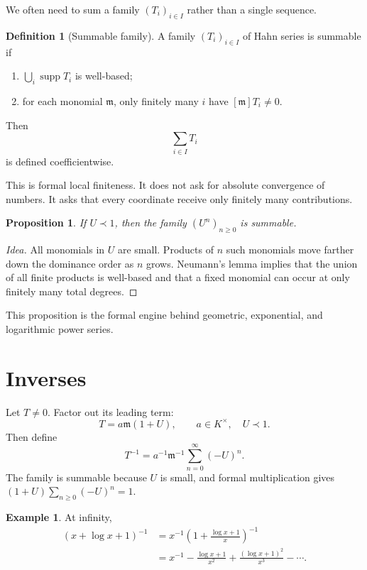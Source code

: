 \documentclass[11pt,oneside]{book}
\newtheorem{proposition}[theorem]{Proposition}
\theoremstyle{definition}
\newtheorem{definition}[theorem]{Definition}
\newtheorem{example}[theorem]{Example}
\theoremstyle{remark}
\newcommand{\m}{\mathfrak{m}}
\newcommand{\supp}{\operatorname{supp}}
\newcommand{\precdom}{\prec}
\begin{document}
We often need to sum a family $(T_i)_{i\in I}$ rather than a single sequence.

\begin{definition}[Summable family]
A family $(T_i)_{i\in I}$ of Hahn series is summable if
\begin{enumerate}
\item $\bigcup_i\supp T_i$ is well-based;
\item for each monomial $\m$, only finitely many $i$ have
      $[\m]T_i\ne0$.
\end{enumerate}
Then
\[
  \sum_{i\in I}T_i
\]
is defined coefficientwise.
\end{definition}

This is formal local finiteness. It does not ask for absolute convergence of
numbers. It asks that every coordinate receive only finitely many contributions.

\begin{proposition}
If $U\precdom1$, then the family $(U^n)_{n\ge0}$ is summable.
\end{proposition}

\begin{proof}[Idea]
All monomials in $U$ are small. Products of $n$ such monomials move farther down
the dominance order as $n$ grows. Neumann's lemma implies that the union of all
finite products is well-based and that a fixed monomial can occur at only
finitely many total degrees.
\end{proof}

This proposition is the formal engine behind geometric, exponential, and
logarithmic power series.

\section{Inverses}

Let $T\ne0$. Factor out its leading term:
\[
  T=a\m(1+U),
  \qquad a\in K^\times,\quad U\precdom1.
\]
Then define
\begin{equation}
  T^{-1}=a^{-1}\m^{-1}\sum_{n=0}^{\infty}(-U)^n.
  \label{eq:hahn-inverse}
\end{equation}
The family is summable because $U$ is small, and formal multiplication gives
$(1+U)\sum_{n\ge0}(-U)^n=1$.

\begin{example}
At infinity,
\begin{align*}
  (x+\log x+1)^{-1}
  &=x^{-1}\left(1+\frac{\log x+1}{x}\right)^{-1}\\
  &=x^{-1}-\frac{\log x+1}{x^2}
    +\frac{(\log x+1)^2}{x^3}-\cdots.
\end{align*}
\end{example}
\end{document}
